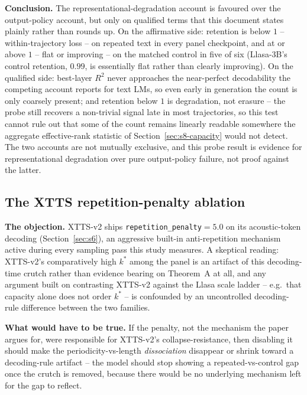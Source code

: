 \documentclass[11pt]{article}
\begin{document}
\textbf{Conclusion.} The representational-degradation account is favoured over
the output-policy account, but only on qualified terms that this document
states plainly rather than rounds up. On the affirmative side: retention is
below $1$ -- within-trajectory loss -- on repeated text in every panel
checkpoint, and at or above $1$ -- flat or improving -- on the matched control
in five of six (Llasa-3B's control retention, $0.99$, is essentially flat
rather than clearly improving). On the qualified side: best-layer $R^2$ never
approaches the near-perfect decodability the competing account reports for
text LMs, so even early in generation the count is only coarsely present; and
retention below $1$ is degradation, not erasure -- the probe still recovers a
non-trivial signal late in most trajectories, so this test cannot rule out
that some of the count remains linearly readable somewhere the aggregate
effective-rank statistic of Section~\ref{sec:s8-capacity} would not detect.
The two accounts are not
mutually exclusive, and this probe result is evidence for representational
degradation over pure output-policy failure, not proof against the latter.

\subsection{The XTTS repetition-penalty ablation}
\label{sec:s8-ablation}

\textbf{The objection.} XTTS-v2 ships \texttt{repetition\_penalty}$=5.0$ on
its acoustic-token decoding (Section~\ref{sec:s6}), an aggressive built-in
anti-repetition mechanism active during every sampling pass this study
measures. A skeptical reading: XTTS-v2's comparatively high $k^\ast$ among the
panel is an artifact of this decoding-time crutch rather than evidence
bearing on Theorem~A at all, and any argument built on contrasting XTTS-v2
against the Llasa scale ladder -- e.g.\ that capacity alone does not order
$k^\ast$ -- is confounded by an uncontrolled decoding-rule difference between
the two families.

\textbf{What would have to be true.} If the penalty, not the mechanism the
paper argues for, were responsible for XTTS-v2's collapse-resistance, then
disabling it should make the periodicity-vs-length \emph{dissociation}
disappear or shrink toward a decoding-rule artifact -- the model should stop
showing a repeated-vs-control gap once the crutch is removed, because there
would be no underlying mechanism left for the gap to reflect.
\end{document}
